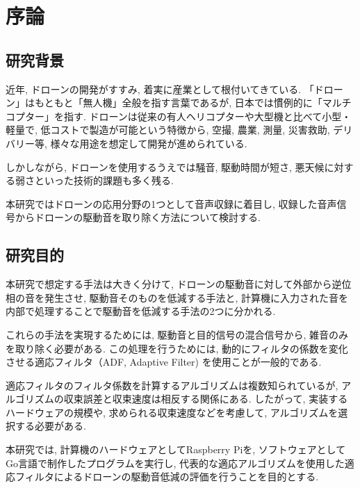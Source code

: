 \chapter{序論}\label{introduction}

\section{研究背景}\label{research-background}

近年, ドローンの開発がすすみ, 着実に産業として根付いてきている. 
「ドローン」はもともと「無人機」全般を指す言葉であるが, 日本では慣例的に「マルチコプター」を指す. 
ドローンは従来の有人ヘリコプターや大型機と比べて小型・軽量で, 低コストで製造が可能という特徴から, 空撮, 農業, 測量, 災害救助, デリバリー等, 様々な用途を想定して開発が進められている. 

しかしながら, ドローンを使用するうえでは騒音, 駆動時間が短さ, 悪天候に対する弱さといった技術的課題も多く残る. 

本研究ではドローンの応用分野の1つとして音声収録に着目し, 収録した音声信号からドローンの駆動音を取り除く方法について検討する. 

\newpage

\section{研究目的}\label{ux7814ux7a76ux76eeux7684}

本研究で想定する手法は大きく分けて, ドローンの駆動音に対して外部から逆位相の音を発生させ, 駆動音そのものを低減する手法と, 計算機に入力された音を内部で処理することで駆動音を低減する手法の2つに分かれる. 

これらの手法を実現するためには, 駆動音と目的信号の混合信号から, 雑音のみを取り除く必要がある. この処理を行うためには, 動的にフィルタの係数を変化させる適応フィルタ（ADF, Adaptive
Filter) を使用ことが一般的である. 

適応フィルタのフィルタ係数を計算するアルゴリズムは複数知られているが, アルゴリズムの収束誤差と収束速度は相反する関係にある. したがって, 実装するハードウェアの規模や, 求められる収束速度などを考慮して, アルゴリズムを選択する必要がある. 

本研究では, 計算機のハードウェアとしてRaspberry
Piを, ソフトウェアとしてGo言語で制作したプログラムを実行し, 代表的な適応アルゴリズムを使用した適応フィルタによるドローンの駆動音低減の評価を行うことを目的とする. 
